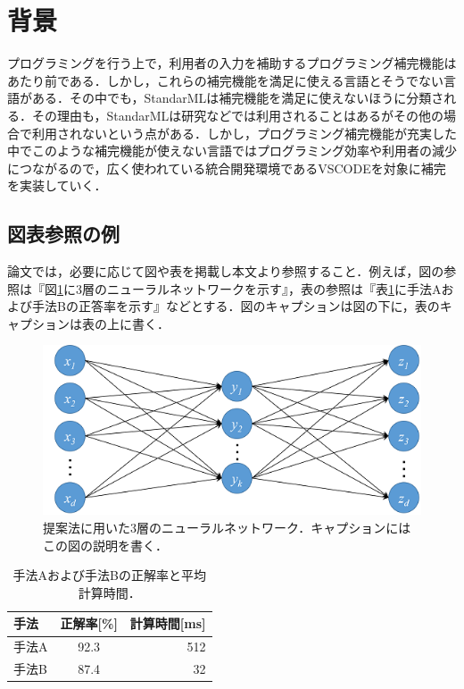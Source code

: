 \documentclass[12pt,a4j]{jreport}
\begin{document}
\section{背景}
プログラミングを行う上で，利用者の入力を補助するプログラミング補完機能はあたり前である．しかし，これらの補完機能を満足に使える言語とそうでない言語がある．その中でも，StandarMLは補完機能を満足に使えないほうに分類される．その理由も，StandarMLは研究などでは利用されることはあるがその他の場合で利用されないという点がある．しかし，プログラミング補完機能が充実した中でこのような補完機能が使えない言語ではプログラミング効率や利用者の減少につながるので，広く使われている統合開発環境であるVSCODEを対象に補完を実装していく．

\subsection{図表参照の例}
論文では，必要に応じて図や表を掲載し本文より参照すること．例えば，図の参照は『図\ref{fig_nn}に3層のニューラルネットワークを示す』，表の参照は『表\ref{table_a}に手法Aおよび手法Bの正答率を示す』などとする．図のキャプションは図の下に，表のキャプションは表の上に書く．

\begin{figure}[ht]
	\centering
	\includegraphics[keepaspectratio, width=120mm]{img/sample.png}
	\caption{提案法に用いた3層のニューラルネットワーク．キャプションにはこの図の説明を書く．}
	\label{fig_nn}
\end{figure}

\begin{table}[ht]
  \caption{手法Aおよび手法Bの正解率と平均計算時間．}
  \label{table_a}
  \centering
  \begin{tabular}{lcr}
    \hline
    手法   & 正解率[\%]  &  計算時間[ms]  \\
    \hline \hline
    手法A  & 92.3  & 512 \\
    手法B  & 87.4  & 32  \\
    \hline
  \end{tabular}
\end{table}
\end{document}
